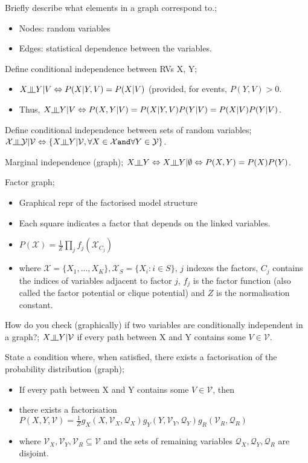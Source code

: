 \documentclass{article}
\newcommand{\indep}{\rotatebox[origin=c]{90}{$\models$}}
\newcommand{\CI}{\mathrel{\text{\scalebox{1.07}{$\perp\mkern-10mu\perp$}}}}
\begin{document}
\indep
\CI
{\perp\!\!\!\perp}

Briefly describe what elements in a graph correspond to.; \begin{itemize} \item Nodes: random variables \item Edges: statistical dependence between the variables.  \end{itemize}

Define conditional independence between RVs X, Y; \begin{itemize} \item $X\indep Y|V \Leftrightarrow P(X|Y, V) = P(X|V)$ (provided, for events, $P(Y,V)>0$.  \item Thus, $X\indep Y|V \Leftrightarrow P(X,Y|V)=P(X|Y,V)P(Y|V)=P(X|V)P(Y|V)$.  \end{itemize}

Define conditional independence between sets of random variables; $\mathcal{X} \indep \mathcal{Y}|\mathcal{V} \Leftrightarrow \{X\indep Y | \mathcal{V}, \forall X \in \mathcal{X} \mathtt{ and }\forall Y \in \mathcal{Y}\}$.

Marginal independence (graph); $X\indep Y \Leftrightarrow X \indep Y | \emptyset \Leftrightarrow P(X,Y) = P(X)P(Y)$.

Factor graph; \begin{itemize} \item Graphical repr of the factorised model structure \item Each square indicates a factor that depends on the linked variables.  \item $P(\mathcal{X})=\frac{1}{Z}\prod_j f_j(\mathcal{X}_{C_j})$ \item where $\mathcal{X}=\{X_1,...,X_K\}, \mathcal{X}_S=\{X_i:i\in S\}$, $j$ indexes the factors, $C_j$ contains the indices of variables adjacent to factor $j$, $f_j$ is the factor function (also called the factor potential or clique potential) and $Z$ is the normalisation constant.  \end{itemize}

How do you check (graphically) if two variables are conditionally independent in a graph?; $X\indep Y|\mathcal{V}$ if every path between X and Y contains some $V\in\mathcal{V}$.

State a condition where, when satisfied, there exists a factorisation of the probability distribution (graph); \begin{itemize} \item If every path between X and Y contains some $V\in\mathcal{V}$, then \item there exists a factorisation $P(X,Y,\mathcal{V})=\frac{1}{Z}g_X(X,\mathcal{V}_X, \mathcal{Q}_X)g_Y(Y,\mathcal{V}_Y, \mathcal{Q}_Y)g_R(\mathcal{V}_R, \mathcal{Q}_R)$ \item where $\mathcal{V}_X, \mathcal{V}_Y, \mathcal{V}_R \subseteq \mathcal{V}$ and the sets of remaining variables $\mathcal{Q}_X,\mathcal{Q}_Y,\mathcal{Q}_R$ are disjoint.  \end{itemize}
\end{document}
